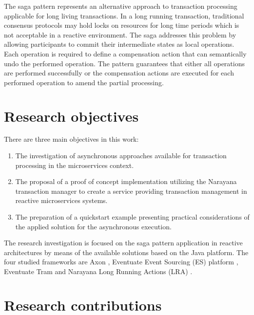 \documentclass[oneside,
  digital, %
  table,   %
  lof,     %
  lot,     %
]{fithesis3}
\begin{document}
The saga pattern \cite{sagas_publ} represents an alternative approach to transaction processing applicable for long living transactions. In a long running transaction, traditional consensus protocols may hold locks on resources for long time periods which is not acceptable in a reactive environment. The saga addresses this problem by allowing participants to commit their intermediate states as local operations. Each operation is required to define a compensation action that can semantically undo the performed operation. The pattern guarantees that either all operations are performed successfully or the compensation actions are executed for each performed operation to amend the partial processing.

\section{Research objectives}

There are three main objectives in this work:

\begin{enumerate}
    \item The investigation of asynchronous approaches available for transaction processing in the microservices context.
    
    \item The proposal of a proof of concept implementation utilizing the Narayana transaction manager \cite{narayana} to create a service providing transaction management in reactive microservices systems.
    
    \item The preparation of a quickstart example presenting practical considerations of the applied solution for the asynchronous execution.
\end{enumerate}

The research investigation is focused on the saga pattern \cite{sagas_publ} application in reactive architectures by means of the available solutions based on the Java platform. The four studied frameworks are Axon \cite{axon_framework}, Eventuate Event Sourcing (ES) platform \cite{eventuate.io}, Eventuate Tram \cite{eventuate-tram} and Narayana Long Running Actions (LRA) \cite{narayana_lra}. 

\hfill \break


\section{Research contributions}
\end{document}
